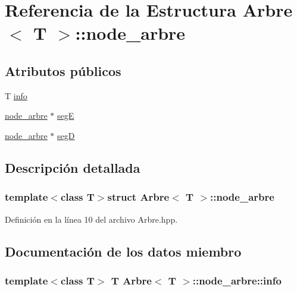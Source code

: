 \hypertarget{struct_arbre_1_1node__arbre}{\section{Referencia de la Estructura Arbre$<$ T $>$\-:\-:node\-\_\-arbre}
\label{struct_arbre_1_1node__arbre}
}
\subsection*{Atributos públicos}
\begin{DoxyCompactItemize}
\item 
T \hyperlink{struct_arbre_1_1node__arbre_a5a146e5e27a7a6c5f54bc6df864595aa}{info}
\item 
\hyperlink{struct_arbre_1_1node__arbre}{node\-\_\-arbre} $\ast$ \hyperlink{struct_arbre_1_1node__arbre_add2e7f2ee789db9f38a3bf2d2dd36972}{seg\-E}
\item 
\hyperlink{struct_arbre_1_1node__arbre}{node\-\_\-arbre} $\ast$ \hyperlink{struct_arbre_1_1node__arbre_a9986e206810ba9e519b5b6e590238093}{seg\-D}
\end{DoxyCompactItemize}


\subsection{Descripción detallada}
\subsubsection*{template$<$class T$>$struct Arbre$<$ T $>$\-::node\-\_\-arbre}



Definición en la línea 10 del archivo Arbre.\-hpp.



\subsection{Documentación de los datos miembro}
\hypertarget{struct_arbre_1_1node__arbre_a5a146e5e27a7a6c5f54bc6df864595aa}{
\subsubsection[{info}]{\setlength{\rightskip}{0pt plus 5cm}template$<$class T$>$ T {\bf Arbre}$<$ T $>$\-::node\-\_\-arbre\-::info}}\label{struct_arbre_1_1node__arbre_a5a146e5e27a7a6c5f54bc6df864595aa}


